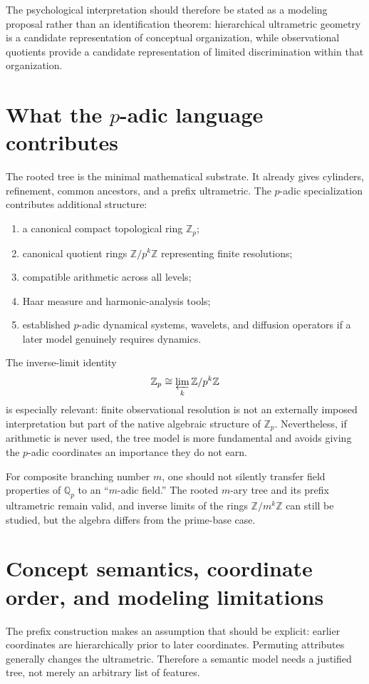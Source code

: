 \documentclass[11pt]{article}
\theoremstyle{definition}
\theoremstyle{remark}
\newcommand{\Z}{\mathbb Z}
\newcommand{\Zp}{\mathbb Z_p}
\newcommand{\Qp}{\mathbb Q_p}
\begin{document}
The psychological interpretation should therefore be stated as a modeling proposal rather than an identification theorem: hierarchical ultrametric geometry is a candidate representation of conceptual organization, while observational quotients provide a candidate representation of limited discrimination within that organization.

\section{What the $p$-adic language contributes}

The rooted tree is the minimal mathematical substrate.  It already gives cylinders, refinement, common ancestors, and a prefix ultrametric.  The $p$-adic specialization contributes additional structure:
\begin{enumerate}[label=(\roman*)]
\item a canonical compact topological ring $\Zp$;
\item canonical quotient rings $\Z/p^k\Z$ representing finite resolutions;
\item compatible arithmetic across all levels;
\item Haar measure and harmonic-analysis tools;
\item established $p$-adic dynamical systems, wavelets, and diffusion operators if a later model genuinely requires dynamics.
\end{enumerate}

The inverse-limit identity
\[
\Zp\cong\varprojlim_k\Z/p^k\Z
\]
is especially relevant: finite observational resolution is not an externally imposed interpretation but part of the native algebraic structure of $\Zp$.  Nevertheless, if arithmetic is never used, the tree model is more fundamental and avoids giving the $p$-adic coordinates an importance they do not earn.

For composite branching number $m$, one should not silently transfer field properties of $\Qp$ to an ``$m$-adic field.''  The rooted $m$-ary tree and its prefix ultrametric remain valid, and inverse limits of the rings $\Z/m^k\Z$ can still be studied, but the algebra differs from the prime-base case.

\section{Concept semantics, coordinate order, and modeling limitations}

The prefix construction makes an assumption that should be explicit: earlier coordinates are hierarchically prior to later coordinates.  Permuting attributes generally changes the ultrametric.  Therefore a semantic model needs a justified tree, not merely an arbitrary list of features.
\end{document}
